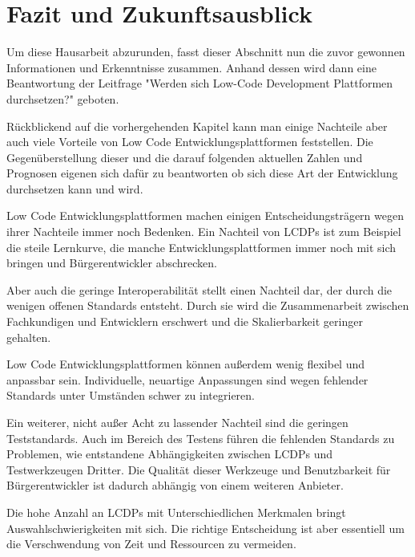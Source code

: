 \documentclass[12pt]{article} %
\begin{document}
	
	\section{Fazit und Zukunftsausblick}
	Um diese Hausarbeit abzurunden, fasst dieser Abschnitt nun die zuvor gewonnen Informationen und Erkenntnisse zusammen. Anhand dessen wird dann eine Beantwortung der Leitfrage "Werden sich Low-Code Development Plattformen durchsetzen?" geboten. \newline
	
	Rückblickend auf die vorhergehenden Kapitel kann man einige Nachteile aber auch viele Vorteile von Low Code Entwicklungsplattformen feststellen. Die Gegenüberstellung dieser und die darauf folgenden aktuellen Zahlen und Prognosen eigenen sich dafür zu beantworten ob sich diese Art der Entwicklung durchsetzen kann und wird. \newline
	
	Low Code Entwicklungsplattformen machen einigen Entscheidungsträgern wegen ihrer Nachteile immer noch Bedenken. Ein Nachteil von LCDPs ist zum Beispiel die steile Lernkurve, die manche Entwicklungsplattformen immer noch mit sich bringen und Bürgerentwickler abschrecken. 
	
	Aber auch die geringe Interoperabilität stellt einen Nachteil dar, der durch die wenigen offenen Standards entsteht. Durch sie wird die Zusammenarbeit zwischen Fachkundigen und Entwicklern erschwert und die Skalierbarkeit geringer gehalten. 
	
	Low Code Entwicklungsplattformen können außerdem wenig flexibel und anpassbar sein. Individuelle, neuartige Anpassungen sind wegen fehlender Standards unter Umständen schwer zu integrieren.
	
	Ein weiterer, nicht außer Acht zu lassender Nachteil sind die geringen Teststandards. Auch im Bereich des Testens führen die fehlenden Standards zu Problemen, wie entstandene Abhängigkeiten zwischen LCDPs und Testwerkzeugen Dritter. Die Qualität dieser Werkzeuge und Benutzbarkeit für Bürgerentwickler ist dadurch abhängig von einem weiteren Anbieter.  

	Die hohe Anzahl an LCDPs mit Unterschiedlichen Merkmalen bringt Auswahlschwierigkeiten mit sich. Die richtige Entscheidung ist aber essentiell um die Verschwendung von Zeit und Ressourcen zu vermeiden. \newline
	
\end{document}
